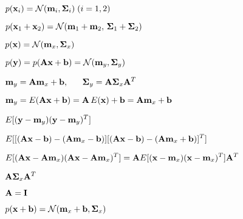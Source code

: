 \documentclass{article}
\def\lthtmlcheckvsize{\ifdim\ht\sizebox<\vsize 
  \ifdim\wd\sizebox<\hsize\expandafter\hfill\fi \expandafter\vfill
  \else\expandafter\vss\fi}%
\begin{document}
{\newpage\clearpage
{}%
$ p({\bf x}_i)={\cal N}({\bf m}_i,{\bf\Sigma}_i)\;(i=1,2)$%
\lthtmlindisplaymathZ
\lthtmlcheckvsize\clearpage}

{\newpage\clearpage
{}%
$ p({\bf x}_1+{\bf x}_2)={\cal N}({\bf m}_1+{\bf m}_2,\,{\bf\Sigma}_1+{\bf\Sigma}_2)$%
\lthtmlindisplaymathZ
\lthtmlcheckvsize\clearpage}

{\newpage\clearpage
{}%
$ p({\bf x})={\cal N}({\bf m}_x,{\bf\Sigma}_x)$%
\lthtmlindisplaymathZ
\lthtmlcheckvsize\clearpage}

{\newpage\clearpage
{}%
$ p({\bf y})=p({\bf Ax}+{\bf b})={\cal N}({\bf m}_y,{\bf\Sigma}_y)$%
\lthtmlindisplaymathZ
\lthtmlcheckvsize\clearpage}

{\newpage\clearpage
{}%
$\displaystyle {\bf m}_y={\bf Am}_x+{\bf b},\;\;\;\;\;\;
{\bf\Sigma}_y={\bf A\Sigma}_x{\bf A}^T$%
\lthtmlindisplaymathZ
\lthtmlcheckvsize\clearpage}

{\newpage\clearpage
{}%
$\displaystyle {\bf m}_y=E({\bf Ax}+{\bf b})={\bf A}\,E({\bf x})+{\bf b}={\bf Am}_x+{\bf b}$%
\lthtmlindisplaymathZ
\lthtmlcheckvsize\clearpage}

{\newpage\clearpage
{}%
$\displaystyle E[ ({\bf y}-{\bf m}_y)({\bf y}-{\bf m}_y)^T ]$%
\lthtmlindisplaymathZ
\lthtmlcheckvsize\clearpage}

{\newpage\clearpage
{}%
$\displaystyle E[ [({\bf Ax}-{\bf b})-({\bf Am}_x-{\bf b})] [({\bf Ax}-{\bf b})-({\bf Am}_x+{\bf b})]^T ]$%
\lthtmlindisplaymathZ
\lthtmlcheckvsize\clearpage}

{\newpage\clearpage
{}%
$\displaystyle E[ ({\bf Ax}-{\bf Am}_x) ({\bf Ax}-{\bf Am}_x)^T ]
={\bf A}E[ ({\bf x}-{\bf m}_x) ({\bf x}-{\bf m}_x)^T ]{\bf A}^T$%
\lthtmlindisplaymathZ
\lthtmlcheckvsize\clearpage}

{\newpage\clearpage
{}%
$\displaystyle {\bf A}{\bf\Sigma}_x{\bf A}^T$%
\lthtmlindisplaymathZ
\lthtmlcheckvsize\clearpage}

{\newpage\clearpage
{}%
$ {\bf A}={\bf I}$%
\lthtmlindisplaymathZ
\lthtmlcheckvsize\clearpage}

{\newpage\clearpage
{}%
$ p({\bf x}+{\bf b})={\cal N}({\bf m}_x+{\bf b},{\bf\Sigma}_x)$%
\lthtmlindisplaymathZ
\lthtmlcheckvsize\clearpage}
\end{document}
